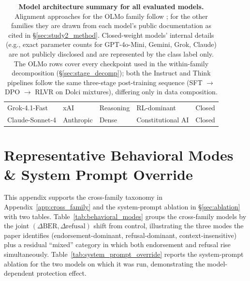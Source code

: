 \documentclass[11pt]{article}
\begin{document}
\begin{table}[H]
\begin{tabular}{l l l l l}
        Grok-4.1-Fast & xAI & Reasoning & RL-dominant \citep{xai2025grok41} & Closed \\
        Claude-Sonnet-4 & Anthropic & Dense & Constitutional AI \citep{bai2022constitutional} & Closed \\
        \bottomrule
    \end{tabular}
    \caption{\textbf{Model architecture summary for all evaluated models.} Alignment approaches for the OLMo family follow \citet{olmo3}; for the other families they are drawn from each model's public documentation as cited in \S\ref{sec:study2_method}. Closed-weight models' internal details (e.g., exact parameter counts for GPT-4o-Mini, Gemini, Grok, Claude) are not publicly disclosed and are represented by the class label only. The OLMo rows cover every checkpoint used in the within-family decomposition (\S\ref{sec:stage_decomp}); both the Instruct and Think pipelines follow the same three-stage post-training sequence (SFT $\to$ DPO $\to$ RLVR on Dolci mixtures), differing only in data composition.}
    \label{tab:arch_summary}
\end{table}

\section{Representative Behavioral Modes \& System Prompt Override}
\label{app:behavioral_examples}

This appendix supports the cross-family taxonomy in Appendix~\ref{app:cross_family} and the system-prompt ablation in \S\ref{sec:ablation} with two tables. Table~\ref{tab:behavioral_modes} groups the cross-family models by the joint $(\Delta\text{BER}, \Delta\text{refusal})$ shift from control, illustrating the three modes the paper identifies (endorsement-dominant, refusal-dominant, context-insensitive) plus a residual ``mixed'' category in which both endorsement and refusal rise simultaneously. Table~\ref{tab:system_prompt_override} reports the system-prompt ablation for the two models on which it was run, demonstrating the model-dependent protection effect.
\end{document}
